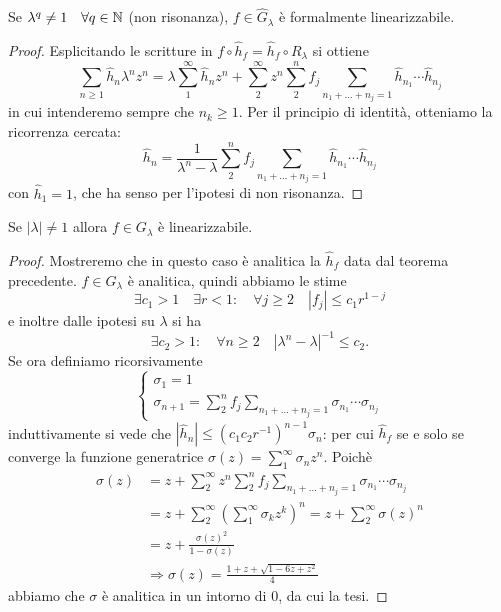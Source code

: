\begin{teo} Se $\lambda^q\neq 1 \quad \forall q\in\mathbb{N}$ (non risonanza), $f\in \hat G_\lambda$ è formalmente linearizzabile.\end{teo}
\begin{proof} Esplicitando le scritture in $f\circ\hat h_f=\hat h_f\circ R_\lambda$ si ottiene
 \[\sum_{n\geq 1} \hat h_n \lambda^nz^n=\lambda\sum_1^\infty\hat h_nz^n+\sum_2^\infty z^n\sum_2^n f_j \sum_{n_1+\dots+n_j=1}\hat h_{n_1}\cdots\hat h_{n_j} \]
 in cui intenderemo sempre che $n_k\geq 1$. Per il principio di identità, otteniamo la ricorrenza cercata:
 \[\hat h_n=\frac{1}{\lambda^n-\lambda}\sum_2^n f_j\sum_{n_1+\dots+n_j=1}\hat h_{n_1}\cdots\hat h_{n_j}\]
 con $\hat h_1=1$, che ha senso per l'ipotesi di non risonanza.
\end{proof}

\begin{teo} Se $|\lambda|\neq 1$ allora $f\in G_\lambda$ è linearizzabile.\end{teo}
\begin{proof}
Mostreremo che in questo caso è analitica la $\hat h_f$ data dal teorema precedente.
 $f\in G_\lambda$ è analitica, quindi abbiamo le stime
 \[\exists c_1>1 \quad \exists r<1 : \quad \forall j\geq 2 \quad |f_j|\leq c_1 r^{1-j}\]
 e inoltre dalle ipotesi su $\lambda$ si ha
 \[\exists c_2>1: \quad \forall n\geq 2 \quad |\lambda^n-\lambda|^{-1}\leq c_2.\]
 Se ora definiamo ricorsivamente
 \[\begin{cases}
       \sigma_1=1\\
       \sigma_{n+1}=\sum_2^n f_j\sum_{n_1+\dots+n_j=1}\sigma_{n_1}\cdots\sigma_{n_j} 
   \end{cases}\]
 induttivamente si vede che $|\hat h_n|\leq (c_1 c_2 r^{-1})^{n-1}\sigma_n$: per cui $\hat h_f$ se e solo se converge la funzione generatrice $\sigma(z)=\sum_1^\infty \sigma_n z^n$. Poichè
 \[\begin{split}
 \sigma(z)&=z+\sum_2^\infty z^n \sum_2^n f_j\sum_{n_1+\dots+n_j=1}\sigma_{n_1}\cdots\sigma_{n_j}\\
	  &=z+\sum_2^\infty \left(\sum_1^\infty \sigma_k z^k\right)^n=z+\sum_2^\infty \sigma(z)^n\\
	  &=z+\frac{\sigma(z)^2}{1-\sigma(z)}\\
	  &\Longrightarrow \sigma(z)=\frac{1+z+\sqrt{1-6z+z^2}}{4}
 \end{split}\]
 abbiamo che $\sigma$ è analitica in un intorno di $0$, da cui la tesi. 
\end{proof}

